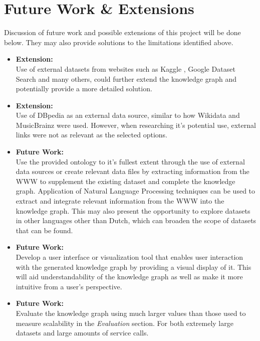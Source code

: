 \section{Future Work \& Extensions}
Discussion of future work and possible extensions of this project will be done below. They may also provide solutions to the limitations identified above.

\begin{itemize}
    \item \textbf{Extension:} \\ Use of external datasets from websites such as Kaggle \cite{kaggle}, Google Dataset Search \cite{googledatasetsearch} and many others, could further extend the knowledge graph and potentially provide a more detailed solution. 
    \item \textbf{Extension:} \\ Use of DBpedia \cite{organdbpedia} as an external data source, similar to how Wikidata and MusicBrainz were used. However, when researching it's potential use, external links were not as relevant as the selected options. 
    \item \textbf{Future Work:} \\ Use the provided ontology to it's fullest extent through the use of external data sources or create relevant data files by extracting information from the WWW to supplement the existing dataset and complete the knowledge graph. Application of Natural Language Processing techniques can be used to extract and integrate relevant information from the WWW into the knowledge graph. This may also present the opportunity to explore datasets in other languages other than Dutch, which can broaden the scope of datasets that can be found. 
    \item \textbf{Future Work:} \\ Develop a user interface or visualization tool that enables user interaction with the generated knowledge graph by providing a visual display of it. This will aid understandability of the knowledge graph as well as make it more intuitive from a user's perspective. 
    \item \textbf{Future Work:} \\ Evaluate the knowledge graph using much larger values than those used to measure scalability in the \textit{Evaluation} section. For both extremely large datasets and large amounts of service calls. 
\end{itemize}

